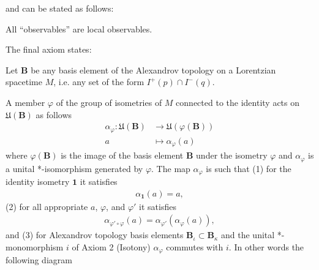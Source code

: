 \begin{definition}
and can be stated as follows:

\begin{definition}
    \label{def:local-completeness-in-curved-spacetime}
    All ``observables'' are local observables.
\end{definition}

The final axiom states:

\begin{definition}
    \label{def:isometric-covariance-in-curved-spacetime}
    Let $\mathbf{B}$ be any basis element of the Alexandrov topology on a Lorentzian spacetime $M$, i.e. any set of the form $I^+(p) \cap I^-(q)$.
    
    A member $\varphi$ of the group of isometries of $M$ connected to the identity acts on $\mathfrak{U}(\mathbf{B})$ as follows
    \begin{align}
        \alpha_\varphi : \mathfrak{U}(\mathbf{B}) &\longrightarrow \mathfrak{U}(\varphi(\mathbf{B})) \\
                                   a              &\longmapsto     \alpha_\varphi(a)
    \end{align}
    where $\varphi(\mathbf{B})$ is the image of the basis element $\mathbf{B}$ under the isometry $\varphi$ and $\alpha_\varphi$ is a unital *-isomorphism generated by $\varphi$. The map $\alpha_\varphi$ is such that (1) for the identity isometry $\mathbf{1}$ it satisfies
    \begin{align}
        \alpha_{\mathbf{1}}(a) = a,
    \end{align}
    (2) for all appropriate $a$, $\varphi$, and $\varphi'$ it satisfies
    \begin{align}
        \alpha_{\varphi' \circ \varphi}(a) = \alpha_{\varphi'}(\alpha_{\varphi}(a)),
    \end{align}
    and (3) for Alexandrov topology basis elements $\mathbf{B}_\iota \subset \mathbf{B}_\kappa$ and the unital *-monomorphism $i$ of Axiom 2 (Isotony) $\alpha_\varphi$ commutes with $i$. In other words the following diagram

    \begin{center}
    \end{center}


\end{definition}
\end{definition}
